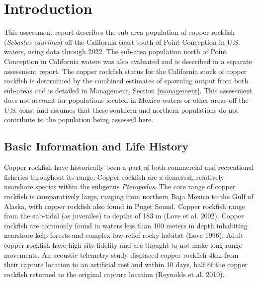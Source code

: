 \documentclass[11pt,
  english,
  letterpaper,
]{article}
\begin{document}
\pagebreak
\setlength{\parskip}{5mm plus1mm minus1mm}
\setcounter{page}{1}
\renewcommand{\thefigure}{\arabic{figure}}
\renewcommand{\thetable}{\arabic{table}}
\setcounter{table}{0}
\setcounter{figure}{0}

\hypertarget{introduction}{%
\section{Introduction}\label{introduction}}

This assessment report describes the sub-area population of copper rockfish (\emph{Sebastes caurinus}) off the California coast south of Point Conception in U.S. waters, using data through 2022. The sub-area population north of Point Conception in California waters was also evaluated and is described in a separate assessment report. The copper rockfish status for the California stock of copper rockfish is determined by the combined estimates of spawning output from both sub-areas and is detailed in Management, Section \ref{management}. This assessment does not account for populations located in Mexico waters or other areas off the U.S. coast and assumes that these southern and northern populations do not contribute to the population being assessed here.

\hypertarget{basic-information-and-life-history}{%
\subsection{Basic Information and Life History}\label{basic-information-and-life-history}}

Copper rockfish have historically been a part of both commercial and recreational fisheries throughout its range. Copper rockfish are a demersal, relatively nearshore species within the subgenus \emph{Pteropodus.} The core range of copper rockfish is comparatively large, ranging from northern Baja Mexico to the Gulf of Alaska, with copper rockfish also found in Puget Sound. Copper rockfish range from the sub-tidal (as juveniles) to depths of 183 m (Love et al. 2002). Copper rockfish are commonly found in waters less than 100 meters in depth inhabiting nearshore kelp forests and complex low-relief rocky habitat (Love 1996). Adult copper rockfish have high site fidelity and are thought to not make long-range movements. An acoustic telemetry study displaced copper rockfish 4km from their capture location to an artificial reef and within 10 days, half of the copper rockfish returned to the original capture location (Reynolds et al. 2010).
\end{document}
